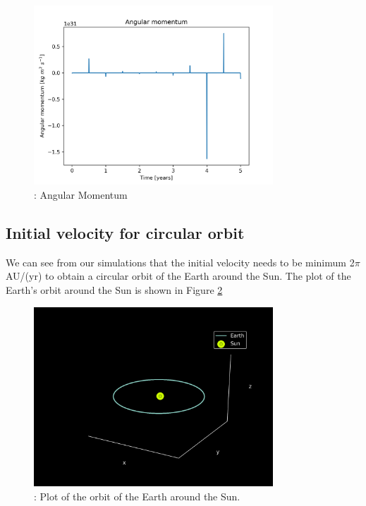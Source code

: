 \documentclass{article}
\begin{document}
    \begin{figure}[H]
        \begin{center}
            \includegraphics[width=0.8\textwidth]{./Plot/angular_momentum.png}
            \caption{: Angular Momentum}
            \label{fig:am}
        \end{center}
    \end{figure}

    \subsection{Initial velocity for circular orbit}
        We can see from our simulations that the initial velocity needs to be minimum 2$\pi$ AU/(yr) to obtain a circular orbit of the Earth around the Sun.
        The plot of the Earth's orbit around the Sun is shown in Figure \ref{fig:earth_orbit}

        \begin{figure}[H]
            \begin{center}
                \includegraphics[width=0.8\textwidth]{./Plot/Earth_orbit.png}
                \caption{: Plot of the orbit of the Earth around the Sun.}
                \label{fig:earth_orbit}
            \end{center}
        \end{figure}
\end{document}
